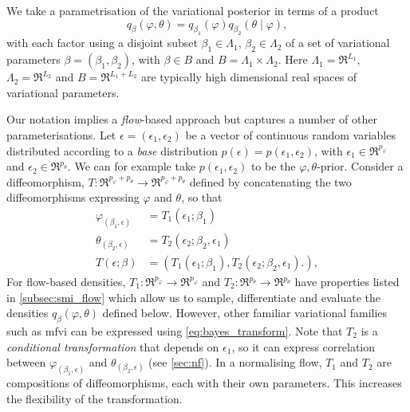 We take a parametrisation of the variational posterior in terms of a product
\begin{equation}\label{eq:q_modular_product}
  q_{\beta}(\varphi,\theta) = q_{\beta_1}(\varphi)q_{\beta_2}(\theta \mid \varphi),
\end{equation}
with each factor using a disjoint subset $\beta_1\in \Lambda_1$, $\beta_2\in \Lambda_2$ of a set of variational parameters $\beta=(\beta_1,\beta_2)$, with $\beta\in B$ and $B=\Lambda_1\times\Lambda_2$. Here $\Lambda_1=\Re^{L_1}$, $\Lambda_2=\Re^{L_2}$ and $B=\Re^{L_1+L_2}$ are typically high dimensional real spaces of variational parameters.

Our notation implies a \emph{flow}-based approach but captures a number of other parameterisations.
Let $\epsilon = (\epsilon_1, \epsilon_2)$ be a vector of continuous random variables distributed according to a \emph{base} distribution $p(\epsilon)=p(\epsilon_1, \epsilon_2)$, with $\epsilon_1\in \Re^{p_\varphi}$ and $\epsilon_2\in \Re^{p_\theta}$. We can for example take $p(\epsilon_1, \epsilon_2)$ to be the $\varphi,\theta$-prior.
Consider a diffeomorphism, $T: \Re^{p_\varphi+p_\theta}\to \Re^{p_\varphi+p_\theta}$ defined by concatenating the two diffeomorphisms expressing $\varphi$ and $\theta$, so that
\begin{align}
  \varphi_{(\beta_1,\epsilon)} & =T_1(\epsilon_1;\beta_1)\nonumber                                                                        \\
  \theta_{(\beta_2,\epsilon)}  & =T_2(\epsilon_2; \beta_2, \epsilon_1)\nonumber                                                           \\
  T(\epsilon; \beta)           & = \left(T_1(\epsilon_1;\beta_1), T_2(\epsilon_2;\beta_2, \epsilon_1). \right),\label{eq:bayes_transform}
\end{align}
For flow-based densities, $T_1: \Re^{p_\varphi}\to \Re^{p_\varphi}$ and $T_2: \Re^{p_\theta}\to \Re^{p_\theta}$ have properties listed in \cref{subsec:smi_flow}  \cite[see][Sec.~3]{Kobyzev2020normalizing} which allow us to sample, differentiate and evaluate the densities $q_\beta(\varphi,\theta)$ defined below. However, other familiar variational families such as \acrshort*{mfvi} can be expressed using \cref{eq:bayes_transform}.
Note that $T_2$ is a \emph{conditional transformation} that depends on $\epsilon_1$, so it can express correlation between $\varphi_{(\beta_1,\epsilon)}$ and $\theta_{(\beta_2,\epsilon)}$ (see \cref{sec:nf}).
In a normalising flow, $T_1$ and $T_2$ are compositions of diffeomorphisms, each with their own parameters. This increases the flexibility of the transformation.

